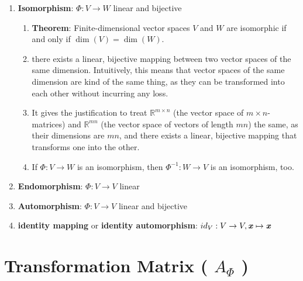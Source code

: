\begin{enumerate}
    \item \textbf{Isomorphism}: $\Phi : V \to W$ linear and bijective
    \hfill \cite{mfml/book/mml/Deisenroth-Faisal-Ong}
    \begin{enumerate}
        \item \textbf{Theorem}: Finite-dimensional vector spaces $V$ and $W$ are isomorphic if and only if $\dim(V ) = \dim(W)$.
        \hfill \cite{mfml/book/mml/Deisenroth-Faisal-Ong}

        \item there exists a linear, bijective mapping between two vector spaces of the same dimension.
        Intuitively, this means that vector spaces of the same dimension are kind of the same thing, as they can be transformed into each other without incurring any loss.
        \hfill \cite{mfml/book/mml/Deisenroth-Faisal-Ong}

        \item It gives the justification to treat $\mathbb{R}^{m\times n}$ (the vector space of $m \times n$-matrices) and $\mathbb{R}^{mn}$ (the vector space of vectors of length $mn$) the same, as their dimensions are $mn$, and there exists a linear, bijective mapping that transforms one into the other.
        \hfill \cite{mfml/book/mml/Deisenroth-Faisal-Ong}

        \item If $\Phi : V \to W$ is an isomorphism, then $\Phi ^{-1} : W \to V$ is an isomorphism, too.
        \hfill \cite{mfml/book/mml/Deisenroth-Faisal-Ong}
    \end{enumerate}

    \item \textbf{Endomorphism}: $\Phi : V \to V$ linear
    \hfill \cite{mfml/book/mml/Deisenroth-Faisal-Ong}

    \item \textbf{Automorphism}: $\Phi : V \to V$ linear and bijective
    \hfill \cite{mfml/book/mml/Deisenroth-Faisal-Ong}

    \item \textbf{identity mapping} or \textbf{identity automorphism}: $id_V : V \to V , \text{\textbf{\textit{x}}} \mapsto \text{\textbf{\textit{x}}}$
    \hfill \cite{mfml/book/mml/Deisenroth-Faisal-Ong}
\end{enumerate}








\section{Transformation Matrix ( $A_\Phi$ )}

